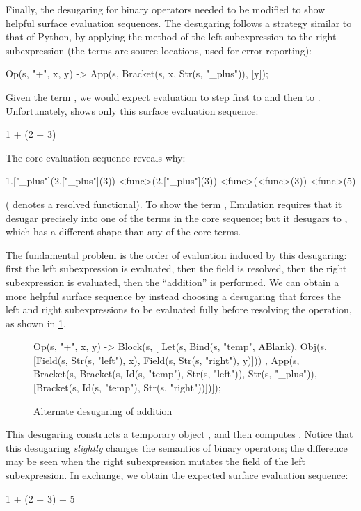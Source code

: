 Finally, the desugaring for binary operators needed to be modified to show helpful
surface evaluation sequences. The desugaring follows
a strategy similar to that of Python, by applying the  method
of the left subexpression to the right subexpression (the  terms
are source locations, used for error-reporting):
\begin{Codes}
  Op(s, "+", x, y)  ->
    App(s, Bracket(s, x, Str(s, "_plus")), [y]);
\end{Codes}
Given the term , we would expect evaluation to step
first to  and then to . Unfortunately, {\Resugarer}
shows only this surface evaluation sequence:
\begin{Codes}
    1 + (2 + 3) 
\end{Codes}
The core evaluation sequence reveals why:
\begin{Codes}
    1.["_plus"](2.["_plus"](3))
\CoreStep <func>(2.["_plus"](3))
\CoreStep <func>(<func>(3))
\CoreStep <func>(5)
\end{Codes}
( denotes a resolved functional). To show the
term , Emulation requires that it desugar
precisely into one of the terms in the core sequence; but it desugars
to , which has a different shape than any of the
core terms.

The fundamental problem is the order of evaluation induced by this
desugaring: first the left subexpression is evaluated, then the
 field is resolved, then the right subexpression is
evaluated, then the ``addition'' is performed. We can obtain a more
helpful surface sequence by instead choosing a desugaring
that forces the left and right subexpressions to be evaluated fully before
resolving the operation, as shown in \cref{fig:reval-alt-plus}.

\begin{figure}[t]
\begin{Codes}
  Op(s, "+", x, y) ->
    Block(s,
    [ Let(s, Bind(s, "temp", ABlank),
             Obj(s, [Field(s, Str(s, "left"), x),
                     Field(s, Str(s, "right"), y)]))
    , App(s, Bracket(s, Bracket(s, Id(s, "temp"),
                                   Str(s, "left")),
                        Str(s, "_plus")),
             [Bracket(s, Id(s, "temp"),
                         Str(s, "right"))])]);
\end{Codes}
\caption{Alternate desugaring of addition}
\label{fig:reval-alt-plus}
\end{figure}
This desugaring constructs a temporary object , and then computes . Notice that
this desugaring \emph{slightly} changes the semantics of binary operators;
the difference may be seen when the right subexpression mutates the
 field of the left subexpression. In exchange, we obtain the
expected surface evaluation sequence:
\begin{Codes}
    1 + (2 + 3)  + 5 
\end{Codes}





